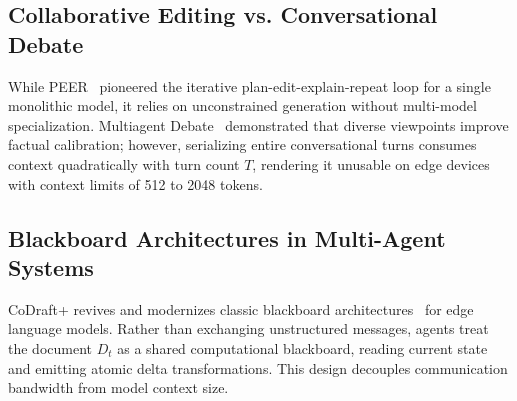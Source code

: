 \documentclass[10pt,journal,compsoc]{IEEEtran}
\begin{document}
\begin{table}[t]
\caption{Taxonomy of Automated Research \& MAS Frameworks}
\label{tab:taxonomy}
\centering
{}
\end{table}

\subsection{Collaborative Editing vs. Conversational Debate}
While PEER~\cite{schick2023peer} pioneered the iterative plan-edit-explain-repeat loop for a single monolithic model, it relies on unconstrained generation without multi-model specialization. Multiagent Debate~\cite{du2024improving,liang2024encouraging} demonstrated that diverse viewpoints improve factual calibration; however, serializing entire conversational turns consumes context quadratically with turn count $T$, rendering it unusable on edge devices with context limits of 512 to 2048 tokens.

\subsection{Blackboard Architectures in Multi-Agent Systems}
CoDraft+ revives and modernizes classic blackboard architectures~\cite{hayes1985blackboard} for edge language models. Rather than exchanging unstructured messages, agents treat the document $D_t$ as a shared computational blackboard, reading current state and emitting atomic delta transformations. This design decouples communication bandwidth from model context size.
\end{document}
